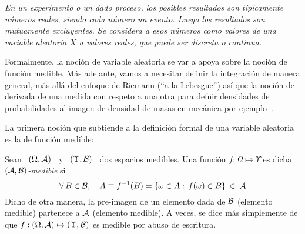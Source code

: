 \label{s:variablealeatoria}

{\it  En  un  experimento  o  un  dado  proceso,  los  posibles  resultados  son
  t\'ipicamente  n\'umeros reales, siendo  cada n\'umero  un evento.   Luego los
  resultados  son mutuamente  excluyentes. Se  considera a  esos  n\'umeros como
  valores de una  \emph{variable aleatoria} $X$ a valores  reales, que puede ser
  discreta o continua.}

Formalmente, la noci\'on de variable aleatoria  se var a apoya sobre la noci\'on
de funci\'on medible. M\'as adelante, vamos a necesitar definir la integraci\'on
de manera general, m\'as all\'a del enfoque de Riemann (``a la Lebesgue'') as\'i
que la  noci\'on de derivada de  una medida con  respeto a una otra  para defnir
densidades de  probabilidades al imagen de  densidad de masas  en mec\'anica por
ejemplo~\cite{Leb04, Leb18, KolFom61, AthLah06, Bog07:v1, Coh13}.



\label{sec:MP:VAPreliminaria}

La  primera noci\'on  que subtiende  a la  definici\'on formal  de  una variable
aleatoria es la de funci\'on medible:

\begin{definicion}
  Sean  \ $(\Omega,\mathcal{A})$  \ y  \ $(\Upsilon,\mathcal{B})$  \ dos  espacios  medibles.  Una
  funci\'on $f: \Omega \mapsto \Upsilon$ es dicha {\it $(\mathcal{A},\mathcal{B})$-medible} si
  \[
  \forall \,  B \in  \mathcal{B}, \quad  A \equiv f^{-1}(B)  = \left\{  \omega \in  A: \,
    f(\omega) \in B \right\} \: \in \: \mathcal{A}
  \]
  Dicho de  otra manera,  la pre-imagen  de un elemento  dada de  $\mathcal{B}$ (elemento
  medible)  partenece  a  $\mathcal{A}$  (elemento  medible).  A  veces,  se  dice  m\'as
  simplemente de que $f: (\Omega,\mathcal{A}) \mapsto (\Upsilon,\mathcal{B})$ es medible por abuso
  de escritura.
\end{definicion}

